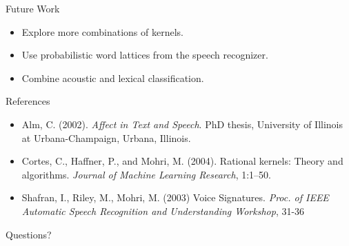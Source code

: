 \documentclass{beamer}
\begin{document}
\begin{frame}{Future Work}
	\begin{itemize}
		\item Explore more combinations of kernels.
		\item Use probabilistic word lattices from the speech recognizer.
		\item Combine acoustic and lexical classification.
	\end{itemize}
\end{frame}

\begin{frame}{References}
	\begin{itemize}
		\item Alm, C. (2002). \emph{Affect in Text and Speech}. PhD thesis, University of Illinois at Urbana-Champaign, Urbana, Illinois.
		\item Cortes, C., Haffner, P., and Mohri, M. (2004). Rational kernels: Theory and algorithms. \emph{Journal of Machine Learning Research}, 1:1–50.

		\item Shafran, I., Riley, M., Mohri, M. (2003) Voice Signatures. \emph{Proc. of IEEE Automatic Speech Recognition and Understanding Workshop}, 31-36 
	\end{itemize}
\end{frame}

\begin{frame}
	\begin{center}
		\Large{Questions?}
	\end{center}
\end{frame}
\end{document}
